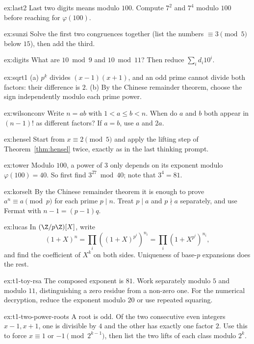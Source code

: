 \begin{hint}{ex:last2}
Last two digits means modulo $100$. Compute $7^2$ and $7^4$ modulo $100$ before reaching for $\varphi(100)$.
\end{hint}
\begin{hint}{ex:sunzi}
Solve the first two congruences together (list the numbers $\equiv3\pmod5$ below $15$), then add the third.
\end{hint}
\begin{hint}{ex:digits}
What are $10\bmod9$ and $10\bmod11$? Then reduce $\sum_id_i10^i$.
\end{hint}
\begin{hint}{ex:sqrt1}
(a) $p^k$ divides $(x-1)(x+1)$, and an odd prime cannot divide both factors: their difference is $2$. (b) By the Chinese remainder theorem, choose the sign independently modulo each prime power.
\end{hint}
\begin{hint}{ex:wilsonconv}
Write $n=ab$ with $1<a\le b<n$. When do $a$ and $b$ both appear in $(n-1)!$ as different factors? If $a=b$, use $a$ and $2a$.
\end{hint}
\begin{hint}{ex:hensel}
Start from $x\equiv2\pmod5$ and apply the lifting step of Theorem~\ref{thm:hensel} twice, exactly as in the last thinking prompt.
\end{hint}
\begin{hint}{ex:tower}
Modulo $100$, a power of $3$ only depends on its exponent modulo $\varphi(100)=40$. So first find $3^{27}\bmod40$; note that $3^4=81$.
\end{hint}
\begin{hint}{ex:korselt}
By the Chinese remainder theorem it is enough to prove $a^n\equiv a\pmod p$ for each prime $p\mid n$. Treat $p\mid a$ and $p\nmid a$ separately, and use Fermat with $n-1=(p-1)q$.
\end{hint}
\begin{hint}{ex:lucas}
In $(\Z/p\Z)[X]$, write
\[(1+X)^n=\prod_i\left((1+X)^{p^i}\right)^{n_i}=\prod_i\left(1+X^{p^i}\right)^{n_i},\]
and find the coefficient of $X^k$ on both sides. Uniqueness of base-$p$ expansions does the rest.
\end{hint}

\begin{hint}{ex:t1-toy-rsa}
The composed exponent is $81$. Work separately modulo $5$ and modulo $11$, distinguishing a zero residue from a non-zero one. For the numerical decryption, reduce the exponent modulo $20$ or use repeated squaring.
\end{hint}
\begin{hint}{ex:t1-two-power-roots}
A root is odd. Of the two consecutive even integers $x-1,x+1$, one is divisible by $4$ and the other has exactly one factor $2$. Use this to force $x\equiv1$ or $-1\pmod{2^{k-1}}$, then list the two lifts of each class modulo $2^k$.
\end{hint}

